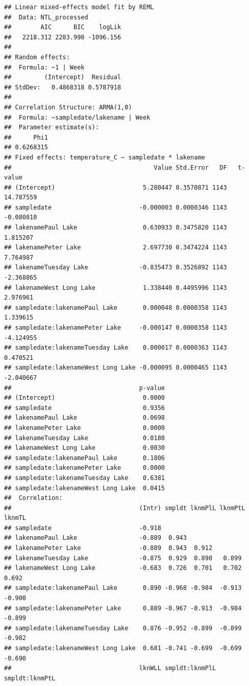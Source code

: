 \documentclass[12pt,]{article}
\begin{document}
\begin{verbatim}
## Linear mixed-effects model fit by REML
##  Data: NTL_processed 
##        AIC      BIC    logLik
##   2218.312 2283.998 -1096.156
## 
## Random effects:
##  Formula: ~1 | Week
##         (Intercept)  Residual
## StdDev:   0.4868318 0.5787918
## 
## Correlation Structure: ARMA(1,0)
##  Formula: ~sampledate/lakename | Week 
##  Parameter estimate(s):
##      Phi1 
## 0.6268315 
## Fixed effects: temperature_C ~ sampledate * lakename 
##                                       Value Std.Error   DF   t-value
## (Intercept)                        5.280447 0.3570871 1143 14.787559
## sampledate                        -0.000003 0.0000346 1143 -0.080810
## lakenamePaul Lake                  0.630933 0.3475820 1143  1.815207
## lakenamePeter Lake                 2.697730 0.3474224 1143  7.764987
## lakenameTuesday Lake              -0.835473 0.3526892 1143 -2.368865
## lakenameWest Long Lake             1.338440 0.4495996 1143  2.976961
## sampledate:lakenamePaul Lake       0.000048 0.0000358 1143  1.339615
## sampledate:lakenamePeter Lake     -0.000147 0.0000358 1143 -4.124955
## sampledate:lakenameTuesday Lake    0.000017 0.0000363 1143  0.470521
## sampledate:lakenameWest Long Lake -0.000095 0.0000465 1143 -2.040667
##                                   p-value
## (Intercept)                        0.0000
## sampledate                         0.9356
## lakenamePaul Lake                  0.0698
## lakenamePeter Lake                 0.0000
## lakenameTuesday Lake               0.0180
## lakenameWest Long Lake             0.0030
## sampledate:lakenamePaul Lake       0.1806
## sampledate:lakenamePeter Lake      0.0000
## sampledate:lakenameTuesday Lake    0.6381
## sampledate:lakenameWest Long Lake  0.0415
##  Correlation: 
##                                   (Intr) smpldt lknmPlL lknmPtL lknmTL
## sampledate                        -0.918                              
## lakenamePaul Lake                 -0.889  0.943                       
## lakenamePeter Lake                -0.889  0.943  0.912                
## lakenameTuesday Lake              -0.875  0.929  0.898   0.899        
## lakenameWest Long Lake            -0.683  0.726  0.701   0.702   0.692
## sampledate:lakenamePaul Lake       0.890 -0.968 -0.984  -0.913  -0.900
## sampledate:lakenamePeter Lake      0.889 -0.967 -0.913  -0.984  -0.899
## sampledate:lakenameTuesday Lake    0.876 -0.952 -0.899  -0.899  -0.982
## sampledate:lakenameWest Long Lake  0.681 -0.741 -0.699  -0.699  -0.690
##                                   lknWLL smpldt:lknmPlL smpldt:lknmPtL

\end{verbatim}
\end{document}
